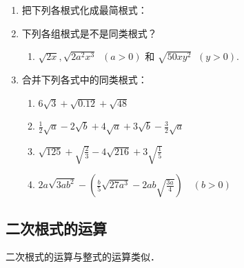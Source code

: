\begin{ex}
\begin{enumerate}
    \item 把下列各根式化成最简根式：
\begin{enumerate}
\end{enumerate}
    \item 下列各组根式是不是同类根式？
    \begin{enumerate}
\item $\sqrt{2 x},\sqrt{2 a^{2} x^{3}}\;\; (a>0)$ 和 $\sqrt{50 x y^{2}}\;\;(y>0)$.
    \end{enumerate}
    \item 合并下列各式中的同类根式：
\begin{enumerate}
    \item $6 \sqrt{3}+\sqrt{0.12}+\sqrt{48}$
    \item $\frac{1}{2} \sqrt{a}- 2 \sqrt{b}+4 \sqrt{a}+3 \sqrt{b}-\frac{3}{2} \sqrt{a}$
    \item $\sqrt{125}+\sqrt{\frac{2}{3}}-4 \sqrt{216}+3 \sqrt{\frac{1}{5}}$
    \item $2 a \sqrt{3 a b^{2}}-\left(\frac{b}{5} \sqrt{27 a^{3}}-2 a b \sqrt{\frac{3a}{4}}\right)\quad (b>0)$
\end{enumerate}
\end{enumerate}
\end{ex}

\subsection{二次根式的运算}
二次根式的运算与整式的运算类似．

